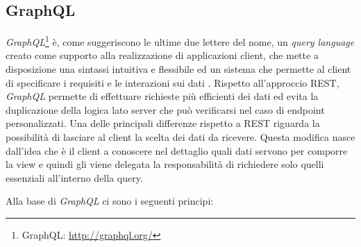 \begin{table}[ht]
	\caption{Esempio RESTful API}
	\label{table:esempio-rest-api}
	\noindent{}
\end{table}

\subsection{GraphQL\label{sec:graphql-introduzione}}

\emph{GraphQL}\footnote{GraphQL: \url{http://graphql.org/}} è, come suggeriscono le ultime due lettere del nome, un \emph{query language} creato come supporto alla realizzazione di applicazioni client, che mette a disposizione una sintassi intuitiva e flessibile ed un sistema che permette al client di specificare i requisiti e le interazioni sui dati \cite{website:graphql-specs}. Rispetto all'approccio REST, \emph{GraphQL} permette di effettuare richieste più efficienti dei dati ed evita la duplicazione della logica lato server che può verificarsi nel caso di endpoint personalizzati. Una delle principali differenze rispetto a REST riguarda la possibilità di lasciare al client la scelta dei dati da ricevere. Questa modifica nasce dall'idea che è il client a conoscere nel dettaglio quali dati servono per comporre la view e quindi gli viene delegata la responsabilità di richiedere solo quelli essenziali all'interno della query.

Alla base di \emph{GraphQL} ci sono i seguenti principi:


